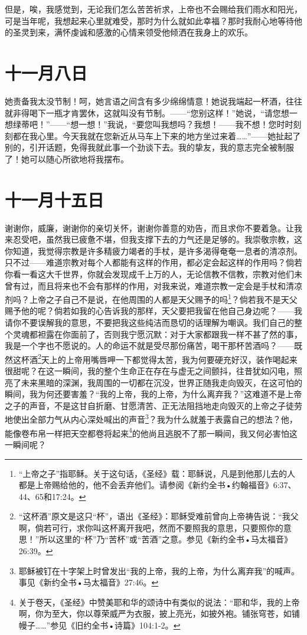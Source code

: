 \documentclass[12pt,oneside]{book}
\begin{document}
但是，唉，我感觉到，无论我们怎么苦苦祈求，上帝也不会赐给我们雨水和阳光，可是当年呢，我想起来心里就难受，那时为什么就如此幸福？那时我耐心地等待他的圣灵到来，满怀虔诚和感激的心情来领受他倾洒在我身上的欢乐。
　　

\chapter{十一月八日}
她责备我太没节制！呵，她言语之间含有多少绵绵情意！她说我端起一杯酒，往往就非得喝下一瓶才肯罢休，这就叫没有节制。——“您别这样！”她说，“请您想一想绿蒂吧！”——“想一想！”我说，“要您叫我想吗？我想！——我不想！您时时刻刻都在我心里。今天我就在您新近从马车上下来的地方坐过来着……”——她扯起了别的，引开话题，免得我就此事一个劲谈下去。我的挚友，我的意志完全被制服了！她可以随心所欲地将我摆布。
　　

\chapter{十一月十五日}
谢谢你，威廉，谢谢你的亲切关怀，谢谢你善意的劝告，而且求你不要着急。让我来忍受吧，虽然我已疲惫不堪，但我支撑下去的力气还是足够的。我崇敬宗教，这你知道，我觉得宗教是许多精疲力竭者的手杖，是许多渴得奄奄一息者的清凉剂。只不过——难道宗教对每个人都能有这样的作用，都必定会起这样的作用吗？倘若你看一看这大千世界，你就会发现成千上万的人，无论信教不信教，宗教对他们未曾有过，而且将来也不会有那样的作用，对我来说，难道宗教一定会是手杖和清凉剂吗？上帝之子自己不是说，在他周围的人都是天父赐予的吗\footnote{“上帝之子”指耶稣。关于这句话，《圣经》载：耶稣说，凡是到他那儿去的人都是上帝赐给他的，他不会丢弃他们。请参阅《新约全书•约翰福音》6:37、44、65和17:24。}？倘若我不是天父赐予他的呢？倘若如我的心告诉我的那样，天父要把我留在他自己身边呢？——我请你不要误解我的意思，不要把我这些纯洁而恳切的话理解为嘲讽。我们自己的整个灵魂都袒露在你面前了，否则我宁愿沉默：对于大家都跟我一样不甚了然的事，我是一个字也不愿说的。人的命运不就是受尽那份痛苦，喝干那杯苦酒吗？——既然这杯酒\footnote{“这杯酒”原文是这只“杯”，语出《圣经》：耶稣受难前曾向上帝祷告说：“我父啊，倘若可行，求你叫这杯离开我吧，然而不要照我的意思，只要照你的意思！”所以这里的“杯”乃“苦杯”或“苦酒”之意。参见《新约全书•马太福音》26:39。}天上的上帝用嘴唇呷一下都觉得太苦，我为何要硬充好汉，装作喝起来很甜呢？在这一瞬间，我的整个生命正在存在与虚无之间颤抖，往昔犹如闪电，照亮了未来黑暗的深渊，我周围的一切都在沉没，世界正随我走向毁灭，在这可怕的瞬间，我为何还要害羞？“我的上帝，我的上帝，为什么离弃我？”这难道不是上帝之子的声音，不是这甘自折磨、甘愿清苦、正无法阻挡地走向毁灭的上帝之子徒劳地使出全部力气从内心深处喊出的声音\footnote{耶稣被钉在十字架上时曾发出“我的上帝，我的上帝，为什么离弃我”的喊声。事见《新约全书•马太福音》27:46。}？我为什么就羞于表露自己的想法？他，能像卷布帛一样把天空都卷将起来\footnote{关于卷天，《圣经》中赞美耶和华的颂诗中有类似的说法：“耶和华，我的上帝啊，你为至大，你以尊荣威严为衣服，披上亮光，如披外袍。铺张穹苍，如铺幔子……”参见《旧约全书•诗篇》104:1-2。}的他尚且逃脱不了那一瞬间，我又何必害怕这一瞬间呢？
　　
\end{document}
